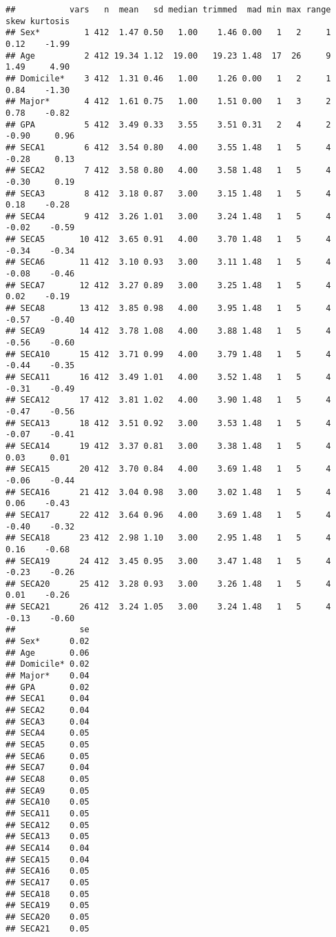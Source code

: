 \documentclass[
]{article}
\begin{document}
\begin{verbatim}
##           vars   n  mean   sd median trimmed  mad min max range  skew kurtosis
## Sex*         1 412  1.47 0.50   1.00    1.46 0.00   1   2     1  0.12    -1.99
## Age          2 412 19.34 1.12  19.00   19.23 1.48  17  26     9  1.49     4.90
## Domicile*    3 412  1.31 0.46   1.00    1.26 0.00   1   2     1  0.84    -1.30
## Major*       4 412  1.61 0.75   1.00    1.51 0.00   1   3     2  0.78    -0.82
## GPA          5 412  3.49 0.33   3.55    3.51 0.31   2   4     2 -0.90     0.96
## SECA1        6 412  3.54 0.80   4.00    3.55 1.48   1   5     4 -0.28     0.13
## SECA2        7 412  3.58 0.80   4.00    3.58 1.48   1   5     4 -0.30     0.19
## SECA3        8 412  3.18 0.87   3.00    3.15 1.48   1   5     4  0.18    -0.28
## SECA4        9 412  3.26 1.01   3.00    3.24 1.48   1   5     4 -0.02    -0.59
## SECA5       10 412  3.65 0.91   4.00    3.70 1.48   1   5     4 -0.34    -0.34
## SECA6       11 412  3.10 0.93   3.00    3.11 1.48   1   5     4 -0.08    -0.46
## SECA7       12 412  3.27 0.89   3.00    3.25 1.48   1   5     4  0.02    -0.19
## SECA8       13 412  3.85 0.98   4.00    3.95 1.48   1   5     4 -0.57    -0.40
## SECA9       14 412  3.78 1.08   4.00    3.88 1.48   1   5     4 -0.56    -0.60
## SECA10      15 412  3.71 0.99   4.00    3.79 1.48   1   5     4 -0.44    -0.35
## SECA11      16 412  3.49 1.01   4.00    3.52 1.48   1   5     4 -0.31    -0.49
## SECA12      17 412  3.81 1.02   4.00    3.90 1.48   1   5     4 -0.47    -0.56
## SECA13      18 412  3.51 0.92   3.00    3.53 1.48   1   5     4 -0.07    -0.41
## SECA14      19 412  3.37 0.81   3.00    3.38 1.48   1   5     4  0.03     0.01
## SECA15      20 412  3.70 0.84   4.00    3.69 1.48   1   5     4 -0.06    -0.44
## SECA16      21 412  3.04 0.98   3.00    3.02 1.48   1   5     4  0.06    -0.43
## SECA17      22 412  3.64 0.96   4.00    3.69 1.48   1   5     4 -0.40    -0.32
## SECA18      23 412  2.98 1.10   3.00    2.95 1.48   1   5     4  0.16    -0.68
## SECA19      24 412  3.45 0.95   3.00    3.47 1.48   1   5     4 -0.23    -0.26
## SECA20      25 412  3.28 0.93   3.00    3.26 1.48   1   5     4  0.01    -0.26
## SECA21      26 412  3.24 1.05   3.00    3.24 1.48   1   5     4 -0.13    -0.60
##             se
## Sex*      0.02
## Age       0.06
## Domicile* 0.02
## Major*    0.04
## GPA       0.02
## SECA1     0.04
## SECA2     0.04
## SECA3     0.04
## SECA4     0.05
## SECA5     0.05
## SECA6     0.05
## SECA7     0.04
## SECA8     0.05
## SECA9     0.05
## SECA10    0.05
## SECA11    0.05
## SECA12    0.05
## SECA13    0.05
## SECA14    0.04
## SECA15    0.04
## SECA16    0.05
## SECA17    0.05
## SECA18    0.05
## SECA19    0.05
## SECA20    0.05
## SECA21    0.05
\end{verbatim}
\end{document}
